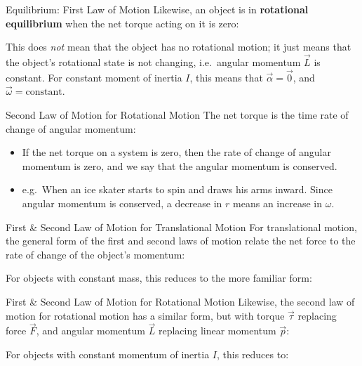 \documentclass[12pt,compress,aspectratio=169]{beamer}
\begin{document}
\begin{frame}{Equilibrium: First Law of Motion}
  Likewise, an object is in \textbf{rotational equilibrium} when the net torque
  acting on it is zero:

  
  This does \emph{not} mean that the object has no rotational motion; it just
  means that the object's rotational state is not changing, i.e.\
  angular momentum $\vec L$ is constant. For constant moment of inertia $I$,
  this means that $\vec\alpha=\vec 0$, and $\vec\omega=\text{constant}$.
\end{frame}



\begin{frame}{Second Law of Motion for Rotational Motion}
  The net torque is the time rate of change of angular momentum:

  \begin{itemize}
  \item If the net torque on a system is zero, then the rate of change
    of angular momentum is zero, and we say that the angular momentum is
    conserved. 
  \item e.g.\ When an ice skater starts to spin and draws his arms inward.
    Since angular momentum is conserved, a decrease in $r$ means an
    increase in $\omega$.
  \end{itemize}
\end{frame}



\begin{frame}{First \& Second Law of Motion for Translational Motion}
  For translational motion, the general form of the first and second laws of
  motion relate the net force to the rate of change of the object's momentum:


  For objects with constant mass, this reduces to the more familiar form:

\end{frame}



\begin{frame}{First \& Second Law of Motion for Rotational Motion}
  Likewise, the second law of motion for rotational motion has a similar form,
  but with torque $\vec\tau$ replacing force $\vec F$, and angular momentum
  $\vec L$ replacing linear momentum $\vec p$:


  For objects with constant momentum of inertia $I$, this reduces to:

\end{frame}
\end{document}
